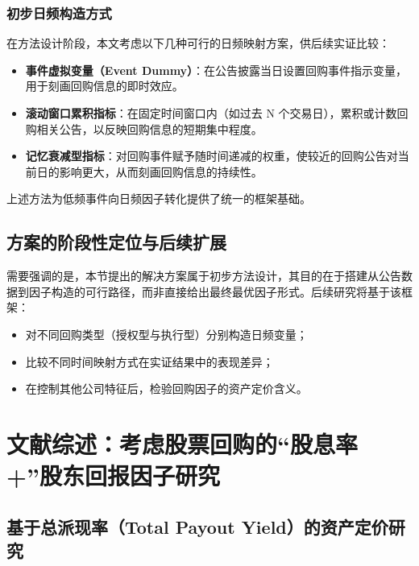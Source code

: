 \documentclass[a4paper,10pt]{article}
\begin{document}
\subsubsection{初步日频构造方式}

在方法设计阶段，本文考虑以下几种可行的日频映射方案，供后续实证比较：

\begin{itemize}
    \item \textbf{事件虚拟变量（Event Dummy）}：在公告披露当日设置回购事件指示变量，用于刻画回购信息的即时效应。
    \item \textbf{滚动窗口累积指标}：在固定时间窗口内（如过去 N 个交易日），累积或计数回购相关公告，以反映回购信息的短期集中程度。
    \item \textbf{记忆衰减型指标}：对回购事件赋予随时间递减的权重，使较近的回购公告对当前日的影响更大，从而刻画回购信息的持续性。
\end{itemize}

上述方法为低频事件向日频因子转化提供了统一的框架基础。

\subsection{方案的阶段性定位与后续扩展}

需要强调的是，本节提出的解决方案属于初步方法设计，其目的在于搭建从公告数据到因子构造的可行路径，而非直接给出最终最优因子形式。后续研究将基于该框架：

\begin{itemize}
    \item 对不同回购类型（授权型与执行型）分别构造日频变量；
    \item 比较不同时间映射方式在实证结果中的表现差异；
    \item 在控制其他公司特征后，检验回购因子的资产定价含义。
\end{itemize}






\appendix 

\label{sec:appendix_literature}
\section{文献综述：考虑股票回购的“股息率+”股东回报因子研究} \label{sec:appendix_literature}


\subsection{基于总派现率（Total Payout Yield）的资产定价研究}
\end{document}
